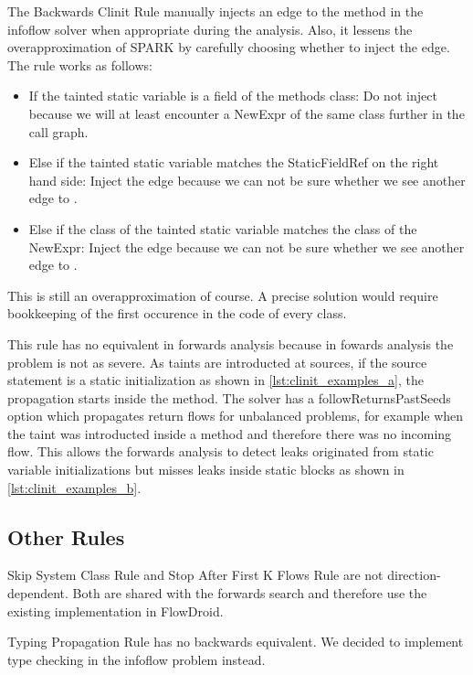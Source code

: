 \documentclass[../draft.tex]{subfiles}
\begin{document}
    The Backwards Clinit Rule manually injects an edge to the  method in the infoflow solver when appropriate during the analysis. Also, it lessens the overapproximation of SPARK by carefully choosing whether to inject the edge. The rule works as follows:
    \begin{itemize}
        \item If the tainted static variable is a field of the methods class: Do not inject because we will at least encounter a NewExpr of the same class further in the call graph.
        \item Else if the tainted static variable matches the StaticFieldRef on the right hand side: Inject the edge because we can not be sure whether we see another edge to .
        \item Else if the class of the tainted static variable matches the class of the NewExpr: Inject the edge because we can not be sure whether we see another edge to .
    \end{itemize}
    This is still an overapproximation of course. A precise solution would require bookkeeping of the first occurence in the code of every class. 

    This rule has no equivalent in forwards analysis because in fowards analysis the problem is not as severe. As taints are introducted at sources, if the source statement is a static initialization as shown in \autoref{lst:clinit_examples_a}, the propagation starts inside the  method. The solver has a followReturnsPastSeeds option which propagates return flows for unbalanced problems, for example when the taint was introducted inside a method and therefore there was no incoming flow. This allows the forwards analysis to detect leaks originated from static variable initializations but misses leaks inside static blocks as shown in \autoref{lst:clinit_examples_b}.

    \subsection{Other Rules}
    Skip System Class Rule and Stop After First K Flows Rule are not direction-dependent. Both are shared with the forwards search and therefore use the existing implementation in FlowDroid.
    
    Typing Propagation Rule has no backwards equivalent. We decided to implement type checking in the infoflow problem instead.
\end{document}
